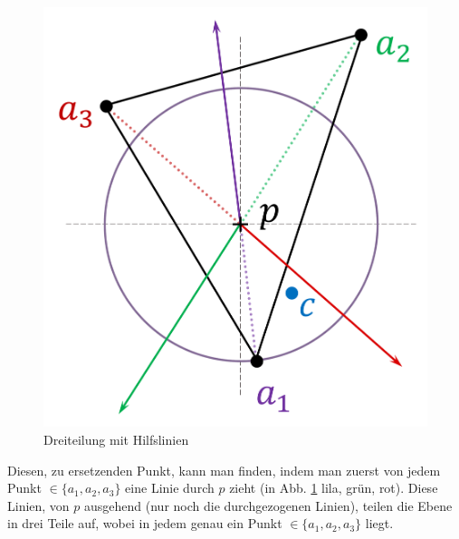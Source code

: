 \documentclass[a4paper]{extarticle}
\begin{document}
    \begin{figure}[!ht]
        \centering	
        \includegraphics[scale=0.15]{bilder/tri_2.pdf}
        \caption{Dreiteilung mit Hilfslinien}
        \label{fig:triangulation_2}
    \end{figure}

    Diesen, zu ersetzenden Punkt, kann man finden, indem man zuerst von jedem Punkt 
    $\in \{ a_1, a_2, a_3 \}$ eine Linie durch $p$ zieht (in Abb. \ref{fig:triangulation_2} lila, 
    grün, rot). Diese Linien, von $p$ ausgehend (nur noch die durchgezogenen Linien), teilen die 
    Ebene in drei Teile auf, wobei in jedem genau ein Punkt $\in \{ a_1, a_2, a_3 \}$ liegt. 
\end{document}
